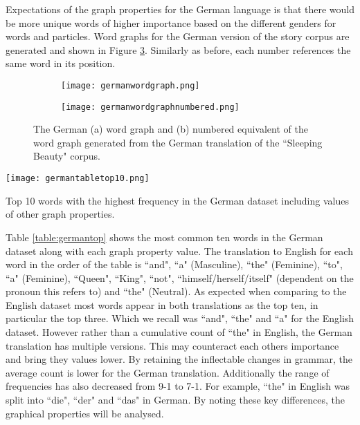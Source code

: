 Expectations of the graph properties for the German language is that there would be more unique words of higher importance based on the different genders for words and particles. Word graphs for the German version of the story corpus are generated and shown in Figure \ref{fig:gergraph}. Similarly as before, each number references the same word in its position.

\begin{figure}[!htb]
\centering
\begin{subfigure}{.45\textwidth}
	\texttt{[image: germanwordgraph.png]}
	\caption{}
	\label{fig:gerword}
\end{subfigure}
\hfill
\begin{subfigure}{.45\textwidth}
	\hspace{-2cm} 
	\texttt{[image: germanwordgraphnumbered.png]}
	\caption{}
	\label{fig:gernum}
\end{subfigure}
\caption{The German (a) word graph and (b) numbered equivalent of the word graph generated from the German translation of the ``Sleeping Beauty" corpus.}
\label{fig:gergraph}
\end{figure}

\begin{table}[!htb]
\centering
\texttt{[image: germantabletop10.png]}
\caption{Top 10 words with the highest frequency in the German dataset including values of other graph properties. }
\label{table:germantop}
\end{table}

Table \ref{table:germantop} shows the most common ten words in the German dataset along with each graph property value. The translation to English for each word in the order of the table is ``and", ``a" (Masculine), ``the" (Feminine), ``to", ``a" (Feminine), ``Queen", ``King", ``not", ``himself/herself/itself" (dependent on the pronoun this refers to) and ``the" (Neutral). As expected when comparing to the English dataset most words appear in both translations as the top ten, in particular the top three. Which we recall was ``and", ``the" and ``a" for the English dataset. However rather than a cumulative count of ``the" in English, the German translation has multiple versions. This may counteract each others importance and bring they values lower. By retaining the inflectable changes in grammar, the average count is lower for the German translation. Additionally the range of frequencies has also decreased from 9-1 to 7-1. For example, ``the" in English was split into ``die", ``der" and ``das" in German. By noting these key differences, the graphical properties will be analysed.

